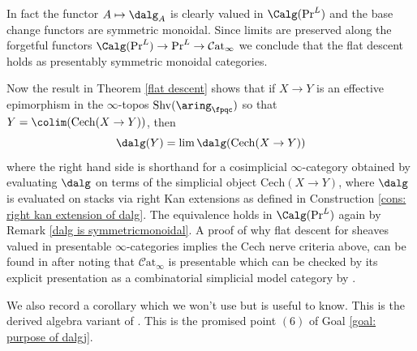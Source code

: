 \documentclass[10pt,reqno]{amsart}
\numberwithin{equation}{section}
\newcommand{\catinf}{\mathcal{C}\mathrm{at}_\infty}
\newcommand{\Shv}{\mathrm{Shv}}
\begin{document}
\begin{remark}\label{dalg is symmetricmonoidal}
    In fact the functor $A\mapsto \dalg_A$ is clearly valued in $\Calg(\Pr^L)$ and the base change functors are symmetric monoidal. Since limits are preserved along the forgetful functors $\Calg(\Pr^L)\to \Pr^L\to \catinf$ we conclude that the flat descent holds as presentably symmetric monoidal categories.
\end{remark}

\begin{remark}\label{lem: dalg evaluated in cech}
   Now the result in Theorem \ref{flat descent} shows that if $X\to Y$ is an effective epimorphism in the $\infty$-topos $\Shv(\aring_{\fpqc})$  so that $Y=\colim(\mathrm{Cech}(X\to Y))$, then $$\dalg(Y)=\lim \dalg(\mathrm{Cech}(X\to Y))$$ where the right hand side is shorthand for a cosimplicial $\infty$-category obtained by evaluating $\dalg$ on terms of the simplicial object $\mathrm{Cech}(X\to Y)$, where $\dalg$ is evaluated on stacks via right Kan extensions as defined in Construction \ref{cons: right kan extension of dalg}.
   The equivalence holds in $\Calg(\Pr^L)$ again by Remark \ref{dalg is symmetricmonoidal}.
   A proof of why flat descent for sheaves valued in presentable $\infty$-categories implies the Cech nerve criteria above, can be found in \cite[Proposition 3.48.]{Yaylali2022NotesDAG} after noting that $\catinf$ is presentable which can be checked by its explicit presentation as a combinatorial simplicial model category by \cite[Proposition 3.1.5.2]{HTT}.
\end{remark}


We also record a corollary which we won't use but is useful to know. This is the derived algebra variant of \cite[Footnote 12]{BS19}. This is the promised point $(6)$ of Goal \ref{goal: purpose of dalgj}.
\end{document}
